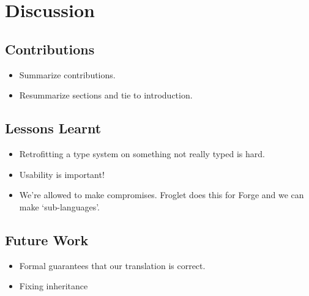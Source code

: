 \section{Discussion}
\subsection{Contributions}

{\color{OliveGreen}
\begin{itemize}
    \item Summarize contributions. 
    \item Resummarize sections and tie to introduction. 
\end{itemize}}

\subsection{Lessons Learnt}
{\color{OliveGreen}
\begin{itemize}
    \item Retrofitting a type system on something not really typed is hard. 
    \item Usability is important!
    \item We're allowed to make compromises. Froglet does this for Forge and we can make `sub-languages'. 
\end{itemize}}

\subsection{Future Work}\label{sec:future-work}
{\color{OliveGreen}
\begin{itemize}
    \item Formal guarantees that our translation is correct. 
    \item Fixing inheritance
\end{itemize}}

